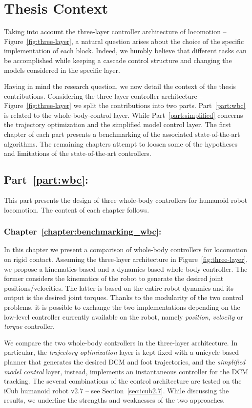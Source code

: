
\section{Thesis Context\label{sec:thesis-context}}

Taking into account the three-layer controller architecture of locomotion -- Figure~\ref{fig:three-layer}, a natural question arises about the choice of the specific implementation of each block. Indeed, we humbly believe that different tasks can be accomplished while keeping a cascade control structure and changing the models considered in the specific layer.  
\par
Having in mind the research question, we now detail the context of the thesis contributions. Considering the three-layer controller architecture -- Figure~\ref{fig:three-layer} we split the contributions into two parts. Part~\ref{part:wbc} is related to the whole-body-control layer. While Part~\ref{part:simplified} concerns the trajectory optimization and the simplified model control layer. The first chapter of each part presents a benchmarking of the associated state-of-the-art algorithms. The remaining chapters attempt to loosen some of the hypotheses and limitations of the state-of-the-art controllers.



\subsection{Part~\ref{part:wbc}: }

This part presents the design of three whole-body controllers for humanoid robot locomotion. The content of each chapter follows.

\subsubsection{Chapter~\ref{chapter:benchmarking_wbc}: }
In this chapter we present a comparison of whole-body controllers for locomotion on rigid contact. Assuming the three-layer architecture in Figure~\ref{fig:three-layer}, we propose a kinematics-based and a dynamics-based whole-body controller. The former considers the kinematics of the robot to generate the desired joint positions/velocities. The latter is based on the entire robot dynamics and its output is the desired joint torques. Thanks to the modularity of the two control problems, it is possible to exchange the two implementations depending on the low-level controller currently available on the robot, namely \emph{position}, \emph{velocity} or \emph{torque} controller.
\par
We compare the two whole-body controllers in the three-layer architecture. In particular, the \emph{trajectory optimization} layer is kept fixed with a unicycle-based planner that generates the desired DCM and foot trajectories, and the \emph{simplified model control} layer, instead, implements an instantaneous controller for the DCM tracking.
The several combinations of the control architecture are tested on the iCub humanoid robot v2.7 -- see Section~\ref{sec:icub2.7}. While discussing the results, we underline the strengths and weaknesses of the two approaches.

